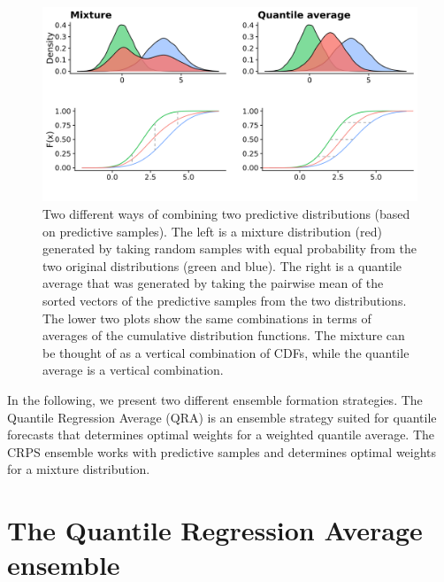 \documentclass[
]{book}
\begin{document}
\begin{figure}
\includegraphics[width=0.95\linewidth]{../visualisation/chapter-4-ensemble/average-mixture-example} \caption{Two different ways of combining two predictive distributions (based on predictive samples). The left is a mixture distribution (red) generated by taking random samples with equal probability from the two original distributions (green and blue). The right is a quantile average that was generated by taking the pairwise mean of the sorted vectors of the predictive samples from the two distributions. The lower two plots show the same combinations in terms of averages of the cumulative distribution functions. The mixture can be thought of as a vertical combination of CDFs, while the quantile average is a vertical combination.}\label{fig:average-mixture-example}
\end{figure}

In the following, we present two different ensemble formation strategies. The Quantile Regression Average (QRA) is an ensemble strategy suited for quantile forecasts that determines optimal weights for a weighted quantile average. The CRPS ensemble works with predictive samples and determines optimal weights for a mixture distribution.

\hypertarget{the-quantile-regression-average-ensemble}{%
\section{The Quantile Regression Average ensemble}\label{the-quantile-regression-average-ensemble}}
\end{document}

